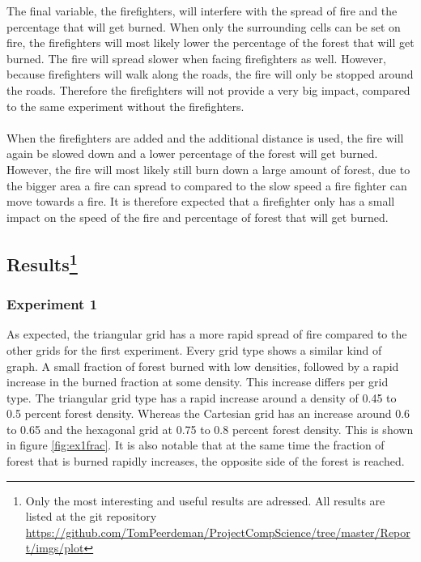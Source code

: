 \documentclass{article}
\begin{document}
\begin{multicols}{2}
The final variable, the firefighters, will interfere with the spread of fire and the percentage that will get burned. When only the surrounding cells can be set on fire, the firefighters will most likely lower the percentage of the forest that will get burned. The fire will spread slower when facing firefighters as well. However, because firefighters will walk along the roads, the fire will only be stopped around the roads. Therefore the firefighters will not provide a very big impact, compared to the same experiment without the firefighters.\\\\
When the firefighters are added and the additional distance is used, the fire will again be slowed down and a lower percentage of the forest will get burned. However, the fire will most likely still burn down a large amount of forest, due to the bigger area a fire can spread to compared to the slow speed a fire fighter can move towards a fire. It is therefore expected that a firefighter only has a small impact on the speed of the fire and percentage of forest that will get burned.


\subsection*{Results\footnote{Only the most interesting and useful results are adressed. All results are listed at the git repository \url{https://github.com/TomPeerdeman/ProjectCompScience/tree/master/Report/imgs/plot}}}
\subsubsection*{Experiment 1}
As expected, the triangular grid has a more rapid spread of fire compared to the other grids for the first experiment. Every grid type shows a similar kind of graph. A small fraction of forest burned with low densities, followed by a rapid increase in the burned fraction at some density. This increase differs per grid type. The triangular grid type has a rapid increase around a density of 0.45 to 0.5 percent forest density. Whereas the Cartesian grid has an increase around 0.6 to 0.65 and the hexagonal grid at 0.75 to 0.8 percent forest density. This is shown in figure \ref{fig:ex1frac}. It is also notable that at the same time the fraction of forest that is burned rapidly increases, the opposite side of the forest is reached.


\end{multicols}
\end{document}
